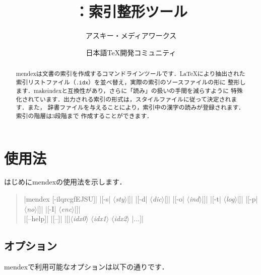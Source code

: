 \documentclass[a4paper,dvipdfmx]{jsarticle}
\title{\SoftName{mendex}：索引整形ツール}
\author{アスキー・メディアワークス \and 日本語\TeX 開発コミュニティ}
\newenvironment{syntax}{\begin{quote}\small}{\end{quote}}
\newcommand{\SoftName}[1]{\textsf{#1}}
\newcommand{\FileExtension}[1]{\texttt{.#1}}
\newcommand{\Meta}[1]{$\langle$\mbox{}\textit{#1}\mbox{}$\rangle$}
\begin{document}
\maketitle

\begin{abstract}
\SoftName{mendex}は文書の索引を作成するコマンドラインツールです．\LaTeX により抽出された
索引リストファイル（\FileExtension{idx}）を並べ替え，実際の索引のソースファイルの形に
整形します．\SoftName{makeindex}と互換性があり，さらに「読み」の扱いの手間を減らすように
特殊化されています．出力される索引の形式は，スタイルファイルに従って決定されます．また，
辞書ファイルを与えることにより，索引中の漢字の読みが登録されます．索引の階層は3段階まで
作成することができます．
\end{abstract}

\tableofcontents
\clearpage

\section{使用法}

はじめに\SoftName{mendex}の使用法を示します．
%
\begin{syntax}
|mendex [-ilqrcgfEJSU]|
|[-s| \Meta{sty}|]|
|[-d| \Meta{dic}|]|
|[-o| \Meta{ind}|]|
|[-t| \Meta{log}|]|
|[-p| \Meta{no}|]|
|[-I| \Meta{enc}|]| \\
%
|[--help]|
|[--]|
|[|\Meta{idx0} \Meta{idx1} \Meta{idx2} |...]|
\end{syntax}

\subsection{オプション}

\SoftName{mendex}で利用可能なオプションは以下の通りです．
\end{document}

